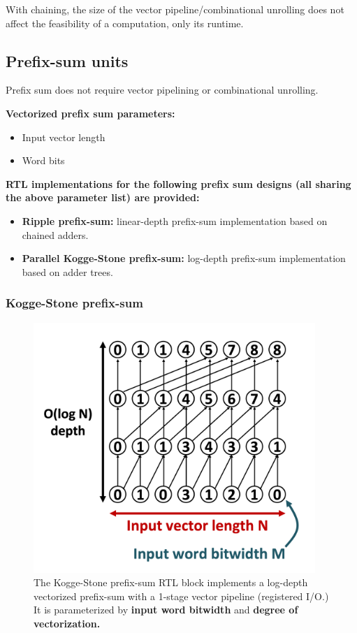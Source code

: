 With chaining, the size of the vector pipeline/combinational unrolling does not affect the feasibility of a computation, only its runtime.

\subsection{Prefix-sum units}

Prefix sum does not require vector pipelining or combinational unrolling.

\textbf{Vectorized prefix sum parameters:}

\begin{itemize}
    \item Input vector length
    \item Word bits
\end{itemize}

\textbf{RTL implementations for the following prefix sum designs (all sharing the above parameter list) are provided:}

\begin{itemize}
    \item \textbf{Ripple prefix-sum:} linear-depth prefix-sum implementation based on chained adders.
    \item \textbf{Parallel Kogge-Stone\cite{koggestone} prefix-sum:} log-depth prefix-sum implementation based on adder trees.
\end{itemize}

\subsubsection{Kogge-Stone prefix-sum}

\begin{figure}[H]
    \centering
    \includegraphics[width=0.95\textwidth]{figures/kogge_stone_prefix_sum.png}
    \caption{The Kogge-Stone\cite{koggestone} prefix-sum RTL block implements a log-depth vectorized prefix-sum with a 1-stage vector pipeline (registered I/O.) It is parameterized by \textbf{input word bitwidth} and \textbf{degree of vectorization.}}
    \label{fig:kogge_stone_prefix_sum}
\end{figure}


